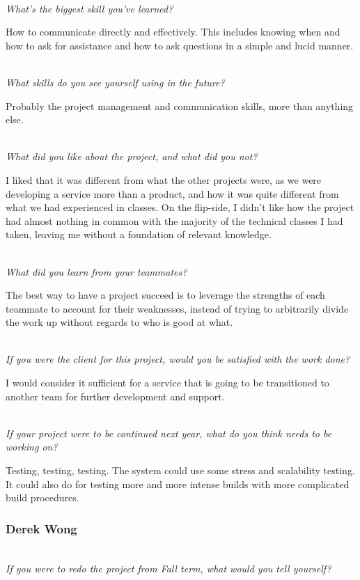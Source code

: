 \documentclass[10pt,letterpaper,onecolumn,draftclsnofoot]{IEEEtran}
\begin{document}
\textit{\\What's the biggest skill you've learned?}

How to communicate directly and effectively. This includes knowing when and how to ask for assistance and how to ask questions in a simple and lucid manner.

\textit{\\What skills do you see yourself using in the future?}

Probably the project management and communication skills, more than anything else.

\textit{\\What did you like about the project, and what did you not?}

I liked that it was different from what the other projects were, as we were developing a service more than a product, and how it was quite different from what we had experienced in classes. On the flip-side, I didn't like how the project had almost nothing in common with the majority of the technical classes I had taken, leaving me without a foundation of relevant knowledge.

\textit{\\What did you learn from your teammates?}

The best way to have a project succeed is to leverage the strengths of each teammate to account for their weaknesses, instead of trying to arbitrarily divide the work up without regards to who is good at what.

\textit{\\If you were the client for this project, would you be satisfied with the work done?}

I would consider it sufficient for a service that is going to be transitioned to another team for further development and support.

\textit{\\If your project were to be continued next year, what do you think needs to be working on?}

Testing, testing, testing. The system could use some stress and scalability testing. It could also do for testing more and more intense builds with more complicated build procedures.\\

\subsubsection{Derek Wong}
\textit{\\If you were to redo the project from Fall term, what would you tell yourself?}
\end{document}
